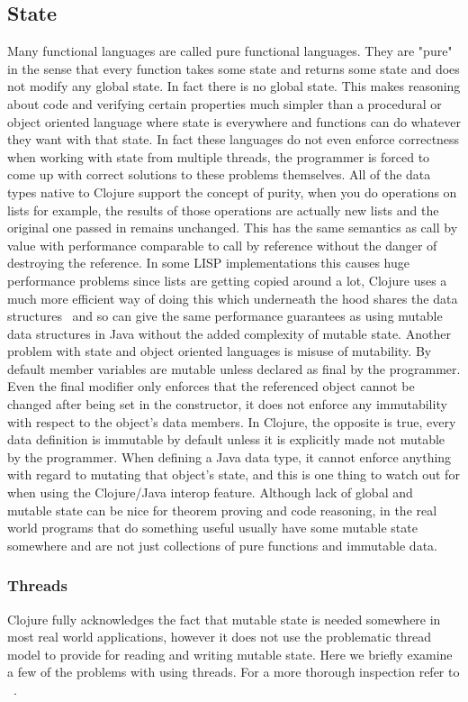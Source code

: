 \subsection{State}
Many functional languages are called pure functional languages. They are "pure" in the sense that every function takes some state and returns some state and does not modify any global state. In fact there is no global state. This makes reasoning about code and verifying certain properties much simpler than a procedural or object oriented language where state is everywhere and functions can do whatever they want with that state\cite{process}. In fact these languages do not even enforce correctness when working with state from multiple threads, the programmer is forced to come up with correct solutions to these problems themselves. All of the data types native to Clojure support the concept of purity, when you do operations on lists for example, the results of those operations are actually new lists and the original one passed in remains unchanged. This has the same semantics as call by value with performance comparable to call by reference without the danger of destroying the reference. In some LISP implementations this causes huge performance problems since lists are getting copied around a lot, Clojure uses a much more efficient way of doing this which underneath the hood shares the data structures~\cite{cljDataStructures} and so can give the same performance guarantees as using mutable data structures in Java without the added complexity of mutable state. Another problem with state and object oriented languages is misuse of mutability. By default member variables are mutable unless declared as final by the programmer. Even the final modifier only enforces that the referenced object cannot be changed after being set in the constructor, it does not enforce any immutability with respect to the object's data members. In Clojure, the opposite is true, every data definition is immutable by default unless it is explicitly made not mutable by the programmer. When defining a Java data type, it cannot enforce anything with regard to mutating that object's state, and this is one thing to watch out for when using the Clojure/Java interop feature. Although lack of global and mutable state can be nice for theorem proving and code reasoning, in the real world programs that do something useful usually have some mutable state somewhere and are not just collections of pure functions and immutable data.  

\subsubsection{Threads}
Clojure fully acknowledges the fact that mutable state is needed somewhere in most real world applications, however it does not use the problematic thread model to provide for reading and writing mutable state. Here we briefly examine a few of the problems with using threads. For a more thorough inspection refer to ~\cite{1076522}.

